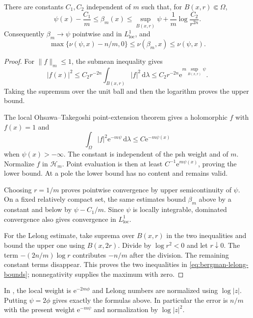 \begin{proposition}\label{prop:bergman-local-estimates}
There are constants $C_1,C_2$ independent of $m$ such that, for $B(x,r)\Subset\Omega$,
\begin{equation}\label{eq:bergman-local-estimates}
 \psi(x)-\frac{C_1}{m}
 \leq\beta_m(x)
 \leq\sup_{B(x,r)}\psi+\frac1m\log\frac{C_2}{r^{2n}}.
\end{equation}
Consequently $\beta_m\to\psi$ pointwise and in $L^1_{\mathrm{loc}}$, and
\begin{equation}\label{eq:bergman-lelong-bounds}
 \max\{\nu(\psi,x)-n/m,0\}
 \leq\nu(\beta_m,x)\leq\nu(\psi,x).
\end{equation}
\end{proposition}
\begin{proof}
For $\|f\|_m\leq1$, the submean inequality gives
\[
 |f(x)|^2
 \leq C_2r^{-2n}\int_{B(x,r)}|f|^2\,\mathrm{d}\lambda
 \leq C_2r^{-2n}\mathrm{e}^{m\sup_{B(x,r)}\psi}.
\]
Taking the supremum over the unit ball and then the logarithm proves the upper bound.

The local Ohsawa--Takegoshi point-extension theorem gives a holomorphic $f$ with $f(x)=1$ and
\[
 \int_\Omega|f|^2\mathrm{e}^{-m\psi}\,\mathrm{d}\lambda
 \leq C \mathrm{e}^{-m\psi(x)}
\]
when $\psi(x)>-\infty$. The constant is independent of the psh weight and of $m$. Normalize $f$ in $\mathcal H_m$. Point evaluation is then at least $C^{-1}\mathrm{e}^{m\psi(x)}$, proving the lower bound. At a pole the lower bound has no content and remains valid.

Choosing $r=1/m$ proves pointwise convergence by upper semicontinuity of $\psi$. On a fixed relatively compact set, the same estimates bound $\beta_m$ above by a constant and below by $\psi-C_1/m$. Since $\psi$ is locally integrable, dominated convergence also gives convergence in $L^1_{\mathrm{loc}}$.

For the Lelong estimate, take suprema over $B(x,r)$ in the two inequalities and bound the upper one using $B(x,2r)$. Divide by $\log r^2<0$ and let $r\downarrow0$. The term $-(2n/m)\log r$ contributes $-n/m$ after the division. The remaining constant terms disappear. This proves the two inequalities in \eqref{eq:bergman-lelong-bounds}; nonnegativity supplies the maximum with zero.
\end{proof}

In \cite{DemAM11}, the local weight is $\mathrm{e}^{-2m\phi}$ and Lelong numbers are normalized using $\log|z|$. Putting $\psi=2\phi$ gives exactly the formulas above. In particular the error is $n/m$ with the present weight $\mathrm{e}^{-m\psi}$ and normalization by $\log|z|^2$.


